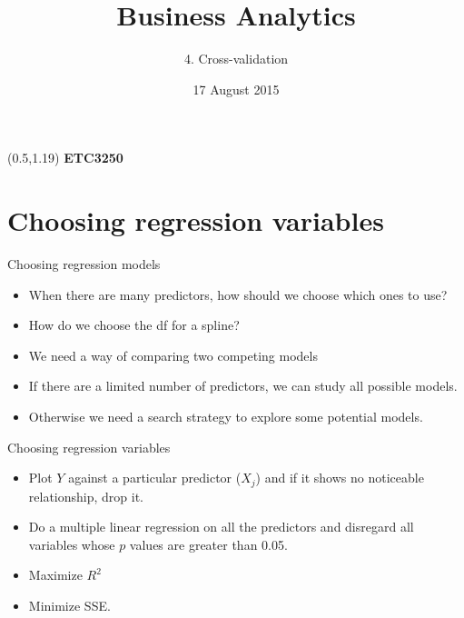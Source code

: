 \documentclass[14pt]{beamer}
\title[4. Cross-validation]{Business Analytics}
\author{4. Cross-validation}
\date{17 August 2015}
\makeatletter
\def\biz{\begin{itemize}[<+-| alert@+>]}
\def\eiz{\end{itemize}}
\makeatother
\begin{document}
\begin{frame}[plain]{}
\maketitle
\begin{textblock}{11}(0.5,1.19){\color{white}\large
\textbf{ETC3250}}
\end{textblock}
\end{frame}


\section{Choosing regression variables}

\begin{frame}{Choosing regression models}
\biz
\item When there are many predictors, how should we choose which ones to use?

\item How do we choose the df for a spline?

\item We need a way of comparing two competing models

\item If there are a limited number of predictors, we can study all possible models.

\item Otherwise we need a search strategy to explore some potential models.
\eiz

\end{frame}


\begin{frame}{Choosing regression variables}


\biz
\item Plot $Y$ against a particular predictor ($X_j$)
       and if it shows no noticeable relationship,  drop it.


\item Do a multiple linear regression on all the predictors
      and
      disregard all variables whose  $p$ values are greater than 0.05.

\item Maximize $R^2$

\item Minimize SSE.
\eiz
\end{frame}%
\end{document}
